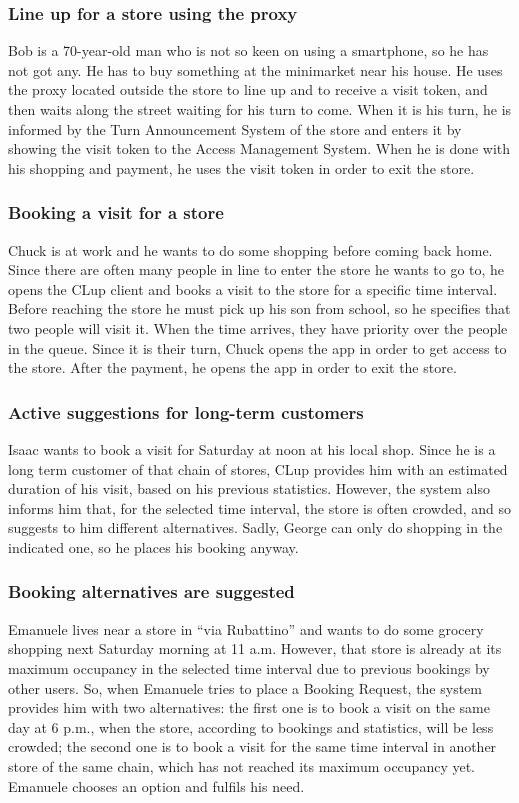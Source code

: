 \documentclass[a4paper,oneside,11pt]{book}   %
\begin{document}
        \subsubsection{Line up for a store using the proxy}
        Bob is a 70-year-old man who is not so keen on using a smartphone, so he has not got any. He has to buy something at the minimarket near his house. He uses the proxy located outside the store to line up and to receive a visit token, and then waits along the street waiting for his turn to come. When it is his turn, he is informed by the Turn Announcement System of the store and enters it by showing the visit token to the Access Management System.  When he is done with his shopping and payment, he uses the visit token in order to exit the store.
        \subsubsection{Booking a visit for a store}
        Chuck is at work and he wants to do some shopping before coming back home. Since there are often many people in line to enter the store he wants to go to, he opens the CLup client and books a visit to the store for a specific time interval. Before reaching the store he must pick up his son from school, so he specifies that two people will visit it. When the time arrives, they have priority over the people in the queue. Since it is their turn, Chuck opens the app in order to get access to the store. After the payment, he opens the app in order to exit the store.
        \subsubsection{Active suggestions for long-term customers}
        Isaac wants to book a visit for Saturday at noon at his local shop. Since he is a long term customer of that chain of stores, CLup provides him with an estimated duration of his visit, based on his previous statistics. However, the system also informs him that, for the selected time interval, the store is often crowded, and so suggests to him different alternatives. Sadly, George can only do shopping in the indicated one, so he places his booking anyway.
        \subsubsection{Booking alternatives are suggested}
        Emanuele lives near a store in “via Rubattino” and wants to do some grocery shopping next Saturday morning at 11 a.m. However, that store is already at its maximum occupancy in the selected time interval due to previous bookings by other users. So, when Emanuele tries to place a Booking Request, the system provides him with two alternatives: the first one is to book a visit on the same day at 6 p.m., when the store, according to bookings and statistics, will be less crowded; the second one is to book a visit for the same time interval in another store of the same chain, which has not reached its maximum occupancy yet. Emanuele chooses an option and fulfils his need. 
\end{document}
